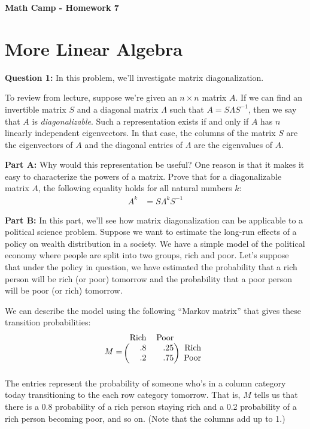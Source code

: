 \documentclass[10pt]{amsart}
\begin{document}
\centerline{\bf Math Camp - Homework 7}

\section{More Linear Algebra}

\textbf{Question 1:} In this problem, we'll investigate matrix diagonalization. 

To review from lecture, suppose we're given an $n \times n$ matrix $A$. If we can find an invertible matrix $S$ and a diagonal matrix $\Lambda$ such that $A = S\Lambda S^{-1}$, then we say that $A$ is {\it diagonalizable}. Such a representation exists if and only if  $A$ has $n$ linearly independent eigenvectors. In that case, the columns of the matrix $S$ are the eigenvectors of $A$ and the diagonal entries of $\Lambda$ are the eigenvalues of $A$. 

\textbf{Part A:} Why would this representation be useful? One reason is that it makes it easy to characterize the powers of a matrix. Prove that for a diagonalizable matrix $A$, the following equality holds for all natural numbers $k$:
\begin{align*}
	A^k &= S \Lambda^k S^{-1}
\end{align*}


\textbf{Part B:} In this part, we'll see how matrix diagonalization can be applicable to a political science problem. Suppose we want to estimate the long-run effects of a policy on wealth distribution in a society. We have a simple model of the political economy where people are split into two groups, rich and poor. Let's suppose that under the policy in question, we have estimated the probability that a rich person will be rich (or poor) tomorrow and the probability that a poor person will be poor (or rich) tomorrow. 

We can describe the model using the following ``Markov matrix'' that gives these transition probabilities: 
$$
M = \begin{blockarray}{ccc}
	 \text{Rich} & \text{Poor} \\
	\begin{block}{(rr)r}
	.8 & .25 & \text{Rich} \\
	 .2 & .75 & \text{Poor} \\
	\end{block}
\end{blockarray}
$$
The entries represent the probability of someone who's in a column category today transitioning to the each row  category tomorrow. That is, $M$ tells us that there is a 0.8 probability of a rich person staying rich and a 0.2 probability of a rich person becoming poor, and so on. (Note that the columns add up to 1.)
\end{document}
